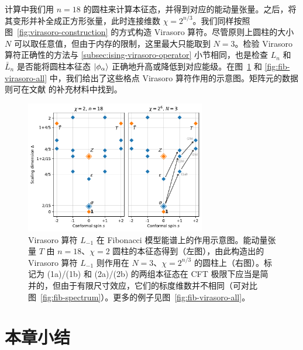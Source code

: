 计算中我们用 $n=18$ 的圆柱来计算本征态，并得到对应的能动量张量。之后，将其变形并补全成正方形张量，此时连接维数 $\chi=2^{n/3}$。我们同样按照图~\ref{fig:virasoro-construction} 的方式构造 Virasoro 算符。尽管原则上圆柱的大小 $N$ 可以取任意值，但由于内存的限制，这里最大只能取到 $N=3$。检验 Virasoro 算符正确性的方法与 \ref{subsec:ising-virasoro-operator} 小节相同，也是检查 $L_n$ 和 $\bar{L}_n$ 是否能将圆柱本征态 $\ket*{\phi_\alpha}$ 正确地升高或降低到对应能级。在图~\ref{fig:fib-virasoro} 和 \ref{fig:fib-virasoro-all} 中，我们给出了这些格点 Virasoro 算符作用的示意图。矩阵元的数据则可在文献 \parencite{zeng2023virasoro} 的补充材料中找到。

\begin{figure}[ht]
  \centering
  \includegraphics[width=0.7\textwidth]{images/fibonacci/fib-virasoro.pdf}
  \caption[Virasoro 算符在 Fibonacci 模型能谱上的作用示意图]{Virasoro 算符 $L_{-1}$ 在 Fibonacci 模型能谱上的作用示意图。能动量张量 $T$ 由 $n=18$、$\chi=2$ 圆柱的本征态得到（左图），由此构造出的 Virasoro 算符 $L_{-1}$ 则作用在 $N=3$、$\chi=2^{n/3}$ 的圆柱上（右图）。标记为 (1a)/(1b) 和 (2a)/(2b) 的两组本征态在 CFT 极限下应当是简并的，但由于有限尺寸效应，它们的标度维数并不相同（可对比图~\ref{fig:fib-spectrum}）。更多的例子见图~\ref{fig:fib-virasoro-all}。}
  \label{fig:fib-virasoro}
\end{figure}

\section{本章小结}

